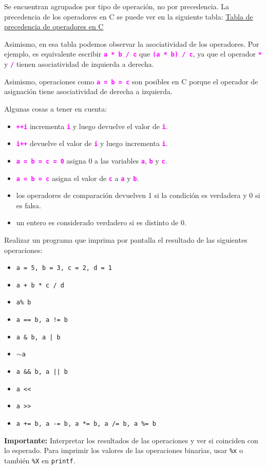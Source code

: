 \documentclass[]{scrartcl}
\newcommand{\hl}[1]{\textcolor{magenta}{\textbf{\texttt{#1}}}}
\begin{document}
Se encuentran agrupados por tipo de operación, no por precedencia. La precedencia de los operadores en C se puede ver en la siguiente tabla: \href{https://en.cppreference.com/w/c/language/operator_precedence}{Tabla de precedencia de operadores en C}

Asimismo, en esa tabla podemos observar la asociatividad de los operadores. Por ejemplo, es equivalente escribir \hl{a * b / c} que \hl{(a * b) / c}, ya que el operador \hl{*} y \hl{/} tienen asociatividad de izquierda a derecha.

Asimismo, operaciones como \hl{a = b = c} son posibles en C porque el operador de asignación tiene asociatividad de derecha a izquierda.

Algunas cosas a tener en cuenta:
\begin{itemize}
  \item \hl{++i} incrementa \hl{i} y luego devuelve el valor de \hl{i}.
  \item \hl{i++} devuelve el valor de \hl{i} y luego incrementa \hl{i}.
  \item \hl{a = b = c = 0} asigna 0 a las variables \hl{a}, \hl{b} y \hl{c}.
  \item \hl{a = b = c} asigna el valor de \hl{c} a \hl{a} y \hl{b}.
  \item los operadores de comparación devuelven 1 si la condición es verdadera y 0 si es falsa.
  \item un entero es considerado verdadero si es distinto de 0.
\end{itemize}

\begin{exbox}[]
  Realizar un programa que imprima por pantalla el resultado de las siguientes operaciones:
  \begin{itemize}
    \item \texttt{a = 5, b = 3, c = 2, d = 1}
    \item \texttt{a + b * c / d}
    \item \texttt{a\space\space\% b}
    \item \texttt{a == b, a != b}
    \item \texttt{a \& b, a | b}
    \item \texttt{$\sim$a}
    \item \texttt{a \&\& b, a || b}
    \item \texttt{a \textless\textless {}}
    \item \texttt{a \textgreater\textgreater {}}
    \item \texttt{a += b, a -= b, a *= b, a /= b, a \%= b}
  \end{itemize}
  \textbf{Importante:} Interpretar los resultados de las operaciones y ver si coinciden con lo esperado. Para imprimir los valores de las operaciones binarias, usar \texttt{\%x} o también \texttt{\%X} en \texttt{printf}.
\end{exbox}
\end{document}

